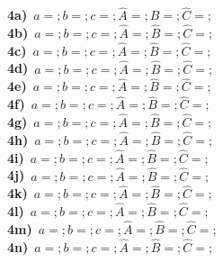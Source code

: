 \textbf{4a)}~$a= ;b=; c=; \widehat{A}= ;\widehat{B}= ;\widehat{C}= ;$ \\
\textbf{4b)}~$a= ;b=; c=; \widehat{A}= ;\widehat{B}= ;\widehat{C}= ;$ \\
\textbf{4c)}~$a= ;b=; c=; \widehat{A}= ;\widehat{B}= ;\widehat{C}= ;$ \\
\textbf{4d)}~$a= ;b=; c=; \widehat{A}= ;\widehat{B}= ;\widehat{C}= ;$ \\
\textbf{4e)}~$a= ;b=; c=; \widehat{A}= ;\widehat{B}= ;\widehat{C}= ;$ \\
\textbf{4f)}~$a= ;b=; c=; \widehat{A}= ;\widehat{B}= ;\widehat{C}= ;$ \\
\textbf{4g)}~$a= ;b=; c=; \widehat{A}= ;\widehat{B}= ;\widehat{C}= ;$ \\
\textbf{4h)}~$a= ;b=; c=; \widehat{A}= ;\widehat{B}= ;\widehat{C}= ;$ \\
\textbf{4i)}~$a= ;b=; c=; \widehat{A}= ;\widehat{B}= ;\widehat{C}= ;$ \\
\textbf{4j)}~$a= ;b=; c=; \widehat{A}= ;\widehat{B}= ;\widehat{C}= ;$ \\
\textbf{4k)}~$a= ;b=; c=; \widehat{A}= ;\widehat{B}= ;\widehat{C}= ;$ \\
\textbf{4l)}~$a= ;b=; c=; \widehat{A}= ;\widehat{B}= ;\widehat{C}= ;$ \\
\textbf{4m)}~$a= ;b=; c=; \widehat{A}= ;\widehat{B}= ;\widehat{C}= ;$ \\
\textbf{4n)}~$a= ;b=; c=; \widehat{A}= ;\widehat{B}= ;\widehat{C}= ;$ \\